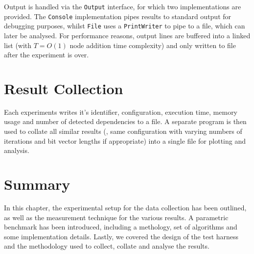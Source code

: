 Output is handled via the \texttt{Output} interface, for which two implementations are provided. The \texttt{Console} implementation pipes results to standard output for debugging purposes, whilst \texttt{File} uses a \texttt{PrintWriter} to pipe to a file, which can later be analysed. For performance reasons, output lines are buffered into a linked list (with $T=O(1)$ node addition time complexity) and only written to file after the experiment is over.

\section{Result Collection} \label{sec:methodology/collection}
Each experiments writes it's identifier, configuration, execution time, memory usage and number of detected dependencies to a file. A separate program is then used to collate all similar results (\ie, same configuration with varying numbers of iterations and bit vector lengths if appropriate) into a single file for plotting and analysis.

\section{Summary} \label{sec:methodology/summary}
In this chapter, the experimental setup for the data collection has been outlined, as well as the measurement technique for the various results. A parametric benchmark has been introduced, including a methology, set of algorithms and some implementation details. Lastly, we covered the design of the test harness and the methodology used to collect, collate and analyse the results.